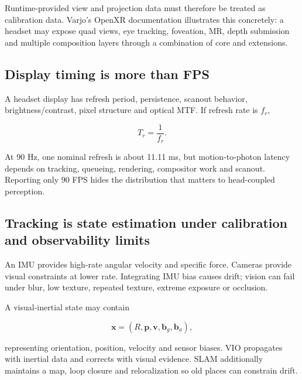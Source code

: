 Runtime-provided view and projection data must therefore be treated as calibration data. Varjo's OpenXR documentation illustrates this concretely: a headset may expose quad views, eye tracking, foveation, MR, depth submission and multiple composition layers through a combination of core and extensions.

\subsection{Display timing is more than FPS}\label{04-visual-computing-ii-ch035-display-timing-is-more-than-fps}

\hypertarget{04-visual-computing-ii-ch035-display-timing-is-more-than-fps}{}

A headset display has refresh period, persistence, scanout behavior, brightness/contrast, pixel structure and optical MTF. If refresh rate is \(f_r\),

\[
T_r=\frac{1}{f_r}.
\]

At 90 Hz, one nominal refresh is about 11.11 ms, but motion-to-photon latency depends on tracking, queueing, rendering, compositor work and scanout. Reporting only 90 FPS hides the distribution that matters to head-coupled perception.

\subsection{Tracking is state estimation under calibration and observability limits}\label{04-visual-computing-ii-ch035-tracking-is-state-estimation-under-calibration-and-observability-limits}

\hypertarget{04-visual-computing-ii-ch035-tracking-is-state-estimation-under-calibration-and-observability-limits}{}

An IMU provides high-rate angular velocity and specific force. Cameras provide visual constraints at lower rate. Integrating IMU bias causes drift; vision can fail under blur, low texture, repeated texture, extreme exposure or occlusion.

A visual-inertial state may contain

\[
\mathbf{x}=(R,\mathbf{p},\mathbf{v},\mathbf{b}_g,\mathbf{b}_a),
\]

representing orientation, position, velocity and sensor biases. VIO propagates with inertial data and corrects with visual evidence. SLAM additionally maintains a map, loop closure and relocalization so old places can constrain drift.

